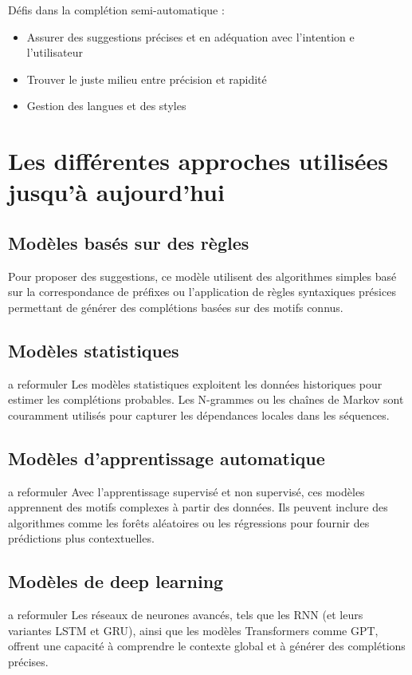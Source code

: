 \documentclass[a4paper, 11pt]{report}
\begin{document}
Défis dans la complétion semi-automatique : 
\begin{itemize}
    \item Assurer des suggestions précises et en adéquation avec l'intention e l'utilisateur
    \item Trouver le juste milieu entre précision et rapidité
    \item Gestion des langues et des styles
\end{itemize}


\chapter{Les différentes approches utilisées jusqu'à aujourd'hui}
\section{Modèles basés sur des règles}
Pour proposer des suggestions, ce modèle utilisent des algorithmes simples basé sur la correspondance de préfixes ou l'application de règles syntaxiques présices permettant de générer des complétions basées sur des motifs connus.

\section{Modèles statistiques}
a reformuler
Les modèles statistiques exploitent les données historiques pour estimer les complétions probables. Les N-grammes ou les chaînes de Markov sont couramment utilisés pour capturer les dépendances locales dans les séquences.

\section{Modèles d’apprentissage automatique}
a reformuler
Avec l’apprentissage supervisé et non supervisé, ces modèles apprennent des motifs complexes à partir des données. Ils peuvent inclure des algorithmes comme les forêts aléatoires ou les régressions pour fournir des prédictions plus contextuelles.

\section{Modèles de deep learning}
a reformuler
Les réseaux de neurones avancés, tels que les RNN (et leurs variantes LSTM et GRU), ainsi que les modèles Transformers comme GPT, offrent une capacité à comprendre le contexte global et à générer des complétions précises.
\end{document}
